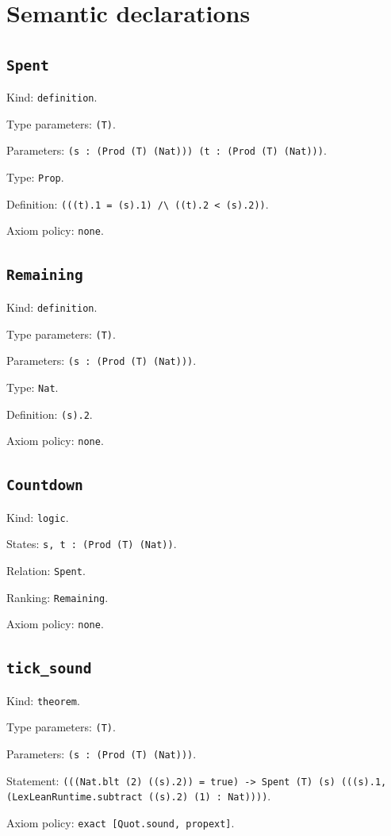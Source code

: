 \documentclass[11pt]{article}
\begin{document}
\section*{Semantic declarations}
\subsection*{\texttt{Spent}}
\noindent Kind: \texttt{definition}.\par
\noindent Type parameters: \texttt{(T)}.\par
\noindent Parameters: \texttt{(s : (Prod (T) (Nat))) (t : (Prod (T) (Nat)))}.\par
\noindent Type: \texttt{Prop}.\par
\noindent Definition: \texttt{(((t).1 = (s).1) /\textbackslash{} ((t).2 < (s).2))}.\par
\noindent Axiom policy: \texttt{none}.\par
\subsection*{\texttt{Remaining}}
\noindent Kind: \texttt{definition}.\par
\noindent Type parameters: \texttt{(T)}.\par
\noindent Parameters: \texttt{(s : (Prod (T) (Nat)))}.\par
\noindent Type: \texttt{Nat}.\par
\noindent Definition: \texttt{(s).2}.\par
\noindent Axiom policy: \texttt{none}.\par
\subsection*{\texttt{Countdown}}
\noindent Kind: \texttt{logic}.\par
\noindent States: \texttt{s, t : (Prod (T) (Nat))}.\par
\noindent Relation: \texttt{Spent}.\par
\noindent Ranking: \texttt{Remaining}.\par
\noindent Axiom policy: \texttt{none}.\par
\subsection*{\texttt{tick\_sound}}
\noindent Kind: \texttt{theorem}.\par
\noindent Type parameters: \texttt{(T)}.\par
\noindent Parameters: \texttt{(s : (Prod (T) (Nat)))}.\par
\noindent Statement: \texttt{(((Nat.blt (2) ((s).2)) = true) -> Spent (T) (s) (((s).1, (LexLeanRuntime.subtract ((s).2) (1) : Nat))))}.\par
\noindent Axiom policy: \texttt{exact [Quot.sound, propext]}.\par
\end{document}
